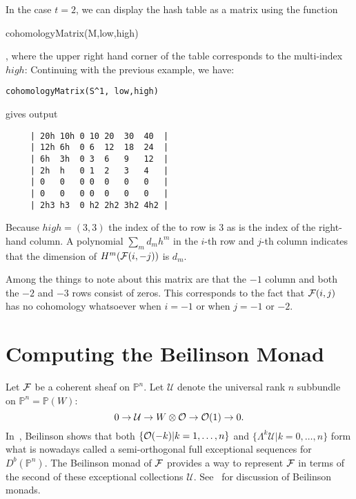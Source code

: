 \documentclass[twoside,12pt, leqno]{amsart}
\def\PP{{\mathbb P}}
\def\CU{{\mathcal U}}
\begin{document}
In the case $t=2$, we can display the hash table as a matrix using the function
\begin{verb}
 cohomologyMatrix(M,low,high)
\end{verb},
where the upper right hand corner of the table corresponds to the multi-index $high$: Continuing with the previous example,
we have:
{\small \begin{verbatim}
cohomologyMatrix(S^1, low,high)
\end{verbatim}
\noindent gives output
\begin{verbatim}
     | 20h 10h 0 10 20  30  40  |
     | 12h 6h  0 6  12  18  24  |
     | 6h  3h  0 3  6   9   12  |
     | 2h  h   0 1  2   3   4   |
     | 0   0   0 0  0   0   0   |
     | 0   0   0 0  0   0   0   |
     | 2h3 h3  0 h2 2h2 3h2 4h2 |
\end{verbatim}}
Because $high = (3,3)$ the index of the to row is 3 as is the index of the right-hand column. A polynomial $\sum_m d_mh^m$ in the $i$-th row and $j$-th column indicates that the dimension
of $H^m({\mathcal F}(i,-j))$ is $d_m$. 

Among the things to note about this matrix are that the $-1$ column and both the $-2$ and $-3$ rows consist of  zeros. This corresponds to the fact that ${\mathcal F}(i,j)$ has no cohomology whatsoever when $i=-1$ or when $j=-1$ or $-2$.

    
\section{Computing the Beilinson Monad}\label{sec:beilinson monad}
Let ${\mathcal F}$ be a coherent sheaf on $\PP^n$. 
Let $\CU$ denote the universal rank $n$ subbundle on $\PP^n=\PP(W)$:
$$ 0 \to \CU \to W\otimes \sO \to \sO(1) \to 0.$$ 
In~\cite{beilinson}, Beilinson shows that both $\{ {\mathcal O}(-k) | k=1,\ldots,n\}$ and 
$\{ \Lambda^k \CU | k=0, \ldots, n\}$ form what is nowadays called a semi-orthogonal full exceptional  sequences for $D^b(\PP^n)$.
The Beilinson monad of ${\mathcal F}$ provides a way to represent ${\mathcal F}$ in terms of the second of these exceptional collections $\CU$.  See~\cite{beilinson,AO,EFS,Huy} for discussion of Beilinson monads.
\end{document}
